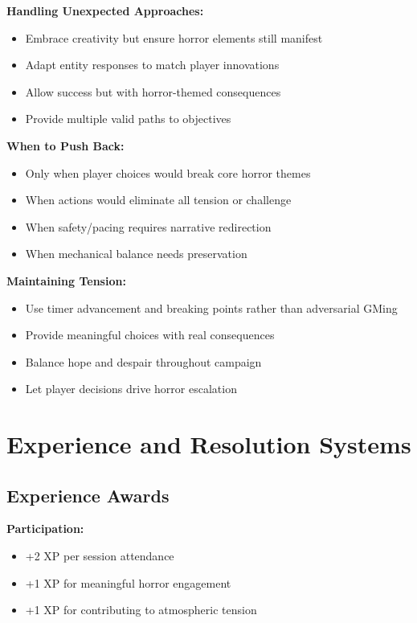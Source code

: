 \documentclass[11pt]{article}
\begin{document}
\textbf{Handling Unexpected Approaches:}
\begin{itemize}
\item Embrace creativity but ensure horror elements still manifest
\item Adapt entity responses to match player innovations
\item Allow success but with horror-themed consequences
\item Provide multiple valid paths to objectives
\end{itemize}

\textbf{When to Push Back:}
\begin{itemize}
\item Only when player choices would break core horror themes
\item When actions would eliminate all tension or challenge
\item When safety/pacing requires narrative redirection
\item When mechanical balance needs preservation
\end{itemize}

\textbf{Maintaining Tension:}
\begin{itemize}
\item Use timer advancement and breaking points rather than adversarial GMing
\item Provide meaningful choices with real consequences
\item Balance hope and despair throughout campaign
\item Let player decisions drive horror escalation
\end{itemize}

\section{Experience and Resolution Systems}

\subsection{Experience Awards}

\textbf{Participation:}
\begin{itemize}
\item +2 XP per session attendance
\item +1 XP for meaningful horror engagement
\item +1 XP for contributing to atmospheric tension
\end{itemize}
\end{document}
